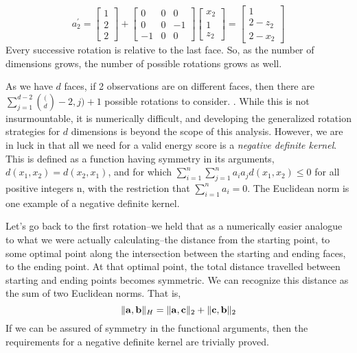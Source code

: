   \begin{equation}
    \label{eq:2drotation}
    a_2^{\prime} = \begin{bmatrix}
    1 \\
    2 \\
    2
    \end{bmatrix}
    +
    \begin{bmatrix}
    0 & 0 & 0  \\
    0 & 0 & -1 \\
    -1 & 0 & 0
    \end{bmatrix}
    \begin{bmatrix}
    x_2 \\
    1 \\
    z_2
    \end{bmatrix} = \begin{bmatrix}
    1 \\
    2 - z_2 \\
    2 - x_2
    \end{bmatrix}
  \end{equation}
Every successive rotation is relative to the last face.  So, as the number of dimensions grows, the
  number of possible rotations grows as well.


As we have $d$ faces, if 2 observations are on different faces, then there are
  $\sum_{j = 1}^{d-2}\binom(d-2,j) + 1$ possible rotations to consider. .  While this is not insurmountable, it is numerically difficult, and developing
  the generalized rotation strategies for $d$ dimensions is beyond the scope of this analysis.
  However, we are in luck in that all we need for a valid energy score is a
  \emph{negative definite kernel}.  This is defined as a function having symmetry in its arguments,
  $d(x_1,x_2) = d(x_2,x_1)$, and for which $\sum_{i =1}^n\sum_{j=1}^na_ia_jd(x_1,x_2) \leq 0$ for
  all positive integers n, with the restriction that $\sum_{i=1}^na_i = 0$.  The Euclidean norm
  is one example of a negative definite kernel.

Let's go back to the first rotation--we held that as a numerically easier analogue to what we were
  actually calculating--the distance from the starting point, to some optimal point along the
  intersection between the starting and ending faces, to the ending point.  At that optimal point,
  the total distance travelled between starting and ending points becomes symmetric.  We can
  recognize this distance as the sum of two Euclidean norms.  That is,
  \begin{equation}
    \lVert {\bf a},{\bf b}\rVert_{H} = \lVert {\bf a}, {\bf c} \rVert_2 + \lVert {\bf c},{\bf b}\rVert_2
  \end{equation}
  If we can be assured of symmetry in the functional arguments, then the requirements for a negative
  definite kernel are trivially proved.

